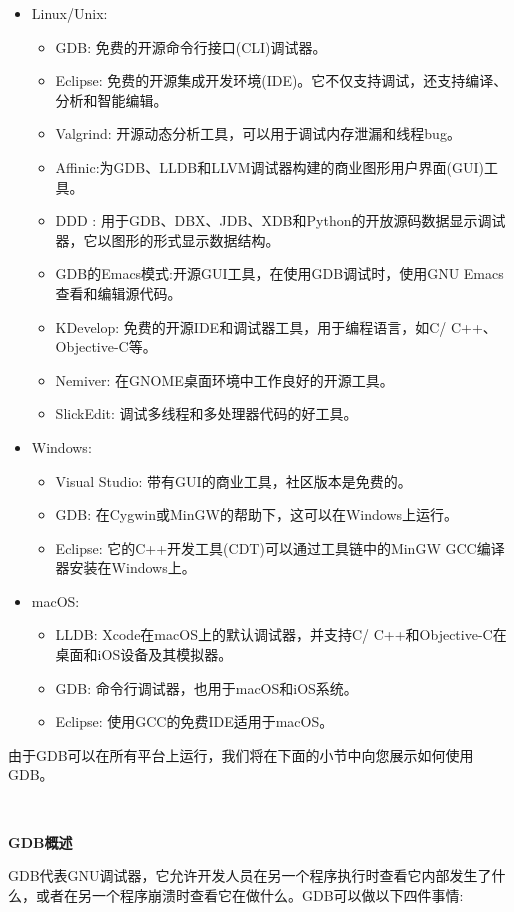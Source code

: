 \begin{itemize}
	\item Linux/Unix:
	\begin{itemize}
		\item GDB: 免费的开源命令行接口(CLI)调试器。
		\item Eclipse: 免费的开源集成开发环境(IDE)。它不仅支持调试，还支持编译、分析和智能编辑。
		\item Valgrind: 开源动态分析工具，可以用于调试内存泄漏和线程bug。
		\item Affinic:为GDB、LLDB和LLVM调试器构建的商业图形用户界面(GUI)工具。
		\item DDD : 用于GDB、DBX、JDB、XDB和Python的开放源码数据显示调试器，它以图形的形式显示数据结构。
		\item GDB的Emacs模式:开源GUI工具，在使用GDB调试时，使用GNU Emacs查看和编辑源代码。
		\item KDevelop: 免费的开源IDE和调试器工具，用于编程语言，如C/ C++、Objective-C等。
		\item Nemiver: 在GNOME桌面环境中工作良好的开源工具。
		\item SlickEdit: 调试多线程和多处理器代码的好工具。
	\end{itemize}
	\item Windows:
	\begin{itemize}
		\item Visual Studio: 带有GUI的商业工具，社区版本是免费的。
		\item GDB: 在Cygwin或MinGW的帮助下，这可以在Windows上运行。
		\item Eclipse: 它的C++开发工具(CDT)可以通过工具链中的MinGW GCC编译器安装在Windows上。
	\end{itemize}
	\item macOS:
	\begin{itemize}
		\item LLDB: Xcode在macOS上的默认调试器，并支持C/ C++和Objective-C在桌面和iOS设备及其模拟器。
		\item GDB: 命令行调试器，也用于macOS和iOS系统。
		\item Eclipse: 使用GCC的免费IDE适用于macOS。
	\end{itemize}
\end{itemize}

由于GDB可以在所有平台上运行，我们将在下面的小节中向您展示如何使用GDB。 \par

\noindent\textbf{}\ \par
\textbf{GDB概述} \ \par
GDB代表GNU调试器，它允许开发人员在另一个程序执行时查看它内部发生了什么，或者在另一个程序崩溃时查看它在做什么。GDB可以做以下四件事情: \par

